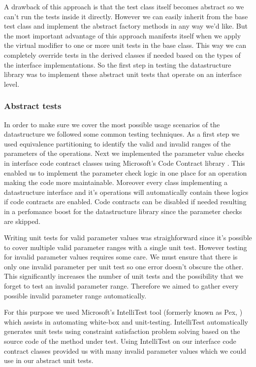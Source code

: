 A drawback of this approach is that the test class itself becomes abstract so we can't run the tests inside it directly. However we can easily inherit from the base test class and implement the abstract factory methods in any way we'd like. But the most important advantage of this approach manifests itself when we apply the virtual modifier to one or more unit tests in the base class. This way we can completely override tests in the derived classes if needed based on the types of the interface implementations. So the first step in testing the datastructure library was to implement these abstract unit tests that operate on an interface level.

\subsubsection{Abstract tests}

In order to make sure we cover the most possible usage scenarios of the datastructure we followed some common testing techniques. As a first step we used equivalence partitioning to identify the valid and invalid ranges of the parameters of the operations. Next we implemented the parameter value checks in interface code contract classes using Microsoft's Code Contract library \citep{CodeContracts}. This enabled us to implement the parameter check logic in one place for an operation making the code more maintainable. Moreover every class implementing a datastructure interface and it's operations will automatically contain these logics if code contracts are enabled. Code contracts can be disabled if needed resulting in a perfomance boost for the datastructure library since the parameter checks are skipped.

Writing unit tests for valid parameter values was straighforward since it's possible to cover multiple valid parameter ranges with a single unit test. However testing for invalid parameter values requires some care. We must ensure that there is only one invalid parameter per unit test so one error doesn't obscure the other. This significantly increases the number of unit tests and the possibility that we forget to test an invalid parameter range. Therefore we aimed to gather every possible invalid parameter range automatically. 

For this purpose we used Microsoft's IntelliTest tool \citep{IntelliTest} (formerly known as Pex, \citep{tillmann2008pex}) which assists in automating white-box and unit-testing. IntelliTest automatically generates unit tests using constraint satisfaction problem solving based on the source code of the method under test. Using IntelliTest on our interface code contract classes provided us with many invalid parameter values which we could use in our abstract unit tests.

